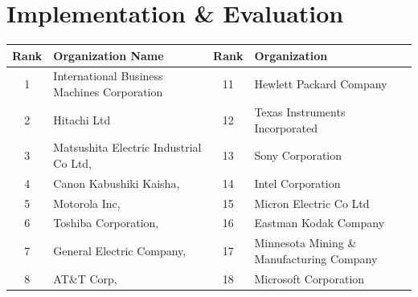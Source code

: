 \section{Implementation \& Evaluation}
\label{sec:eval}


\begin{table}[t]
\centering
\begin{tabular}{clcl}
\hline
\multicolumn{1}{|l|}{\textbf{Rank}} & \multicolumn{1}{l|}{\textbf{Organization Name}}                  & \multicolumn{1}{l|}{\textbf{Rank}} & \multicolumn{1}{l|}{\textbf{Organization}}                     \\ \hline
\multicolumn{1}{|c|}{1}             & \multicolumn{1}{l|}{International Business Machines Corporation} & \multicolumn{1}{c|}{11}            & \multicolumn{1}{l|}{Hewlett Packard Company}                   \\ \hline
\multicolumn{1}{|c|}{2}             & \multicolumn{1}{l|}{Hitachi Ltd}                                 & \multicolumn{1}{c|}{12}            & \multicolumn{1}{l|}{Texas Instruments Incorporated}            \\ \hline
\multicolumn{1}{|c|}{3}             & \multicolumn{1}{l|}{Matsushita Electric Industrial Co Ltd,}      & \multicolumn{1}{c|}{13}            & \multicolumn{1}{l|}{Sony Corporation}                          \\ \hline
\multicolumn{1}{|c|}{4}             & \multicolumn{1}{l|}{Canon Kabushiki Kaisha,}                     & \multicolumn{1}{c|}{14}            & \multicolumn{1}{l|}{Intel Corporation}                         \\ \hline
\multicolumn{1}{|c|}{5}             & \multicolumn{1}{l|}{Motorola Inc,}                               & \multicolumn{1}{c|}{15}            & \multicolumn{1}{l|}{Micron Electric Co Ltd}                    \\ \hline
\multicolumn{1}{|c|}{6}             & \multicolumn{1}{l|}{Toshiba Corporation,}                        & \multicolumn{1}{c|}{16}            & \multicolumn{1}{l|}{Eastman Kodak Company}                     \\ \hline
\multicolumn{1}{|c|}{7}             & \multicolumn{1}{l|}{General Electric Company,}                   & \multicolumn{1}{c|}{17}            & \multicolumn{1}{l|}{Minnesota Mining \& Manufacturing Company} \\ \hline
\multicolumn{1}{|c|}{8}             & \multicolumn{1}{l|}{AT\&T Corp,}                                 & \multicolumn{1}{c|}{18}            & \multicolumn{1}{l|}{Microsoft Corporation}                     \\ \hline

\end{tabular}
\end{table}
